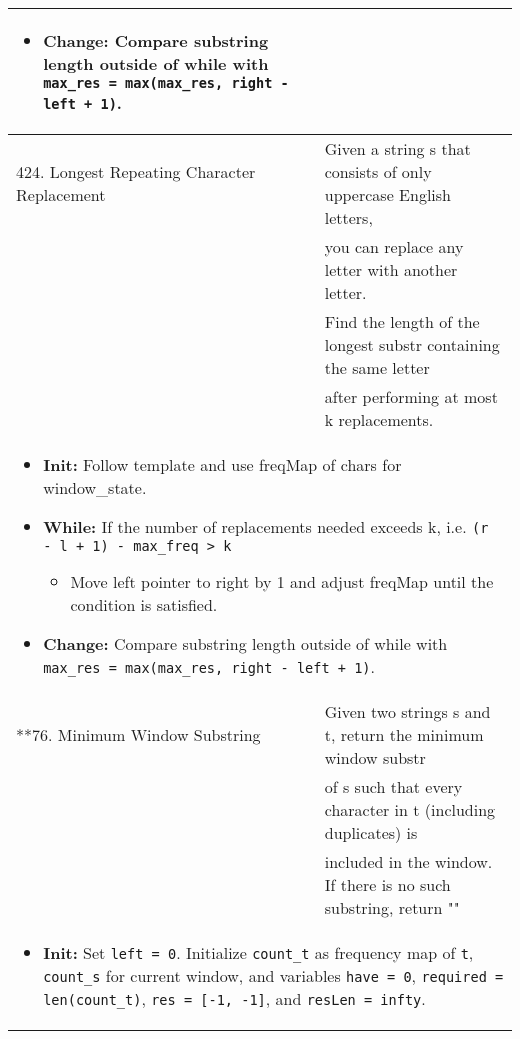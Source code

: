 \begin{summary}
\begin{center}
\begin{tabular}{ll}
{\begin{itemize}
                    \item \textbf{Change:} Compare substring length outside of while with \texttt{max\_res = max(max\_res, right - left + 1)}.
                \end{itemize}
            } \\
            \midrule
            424. Longest Repeating Character Replacement & Given a string s that consists of only uppercase English letters, \\
            & you can replace any letter with another letter. \\
            & Find the length of the longest substr containing the same letter \\
            & after performing at most k replacements. \\
            \multicolumn{2}{p{\linewidth}}{
                \begin{itemize}
                    \item \textbf{Init:} Follow template and use freqMap of chars for window\_state.
                    \item \textbf{While:} If the number of replacements needed exceeds k, i.e. \texttt{(r - l + 1) - max\_freq > k}
                    \begin{itemize}
                        \item Move left pointer to right by 1 and adjust freqMap until the condition is satisfied.
                    \end{itemize}
                    \item \textbf{Change:} Compare substring length outside of while with \texttt{max\_res = max(max\_res, right - left + 1)}.
                \end{itemize}
            } \\
            \midrule
            **76. Minimum Window Substring & Given two strings s and t, return the minimum window substr \\
            & of s such that every character in t (including duplicates) is \\
            & included in the window. If there is no such substring, return "" \\
            \multicolumn{2}{p{\linewidth}}{
                \begin{itemize}
                    \item \textbf{Init:} Set \texttt{left = 0}. Initialize \texttt{count\_t} as frequency map of \texttt{t}, \texttt{count\_s} for current window, and variables \texttt{have = 0}, \texttt{required = len(count\_t)}, \texttt{res = [-1, -1]}, and \texttt{resLen = infty}.
                    

\end{itemize}}
\end{tabular}
\end{center}
\end{summary}
